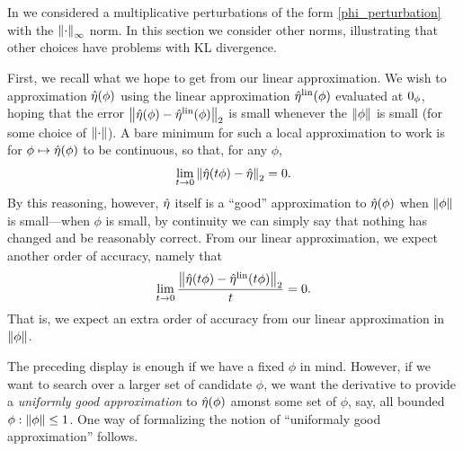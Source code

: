 In  we considered a multiplicative perturbations
of the form \eqref{phi_perturbation} with the $\left\Vert\cdot\right\Vert_{\infty}$ norm.  In
this section we consider other norms, illustrating that other choices
have problems with KL divergence.

First, we recall what we hope to get from our linear approximation.  We wish to
approximation $\hat\eta(\phi)$ using the linear approximation $\hat\eta^{\mathrm{lin}}(\phi)$
evaluated at $0_\phi$, hoping that the error $\left\Vert\hat\eta(\phi) -
\hat\eta^{\mathrm{lin}}(\phi)\right\Vert_2$ is small whenever the $\left\Vert\phi\right\Vert$ is small (for some choice
of $\left\Vert\cdot\right\Vert$).  A bare minimum for such a local approximation to work is
for $\phi \mapsto \hat\eta(\phi)$ to be continuous, so that, for any
$\phi$,
%
\begin{align*}
%
\lim_{t \rightarrow 0} \norm{\etaopt(t \phi) - \etaopt}_2 = 0.
%
\end{align*}
%
By this reasoning, however, $\hat\eta$ itself is a ``good'' approximation to
$\hat\eta(\phi)$ when $\left\Vert\phi\right\Vert$ is small---when $\phi$ is small, by
continuity we can simply say that nothing has changed and be reasonably correct.
From our linear approximation, we expect another order of accuracy, namely that
%
\begin{align*}
%
\lim_{t \rightarrow 0} \frac{\norm{\etaopt(t \phi) - \etalin(t\phi)}_2}{t} = 0.
%
\end{align*}
%
That is, we expect an extra order of accuracy from our linear approximation
in $\left\Vert\phi\right\Vert$.

The preceding display is enough if we have a fixed $\phi$ in mind.  However, if
we want to search over a larger set of candidate $\phi$, we want the derivative
to provide a {\em uniformly good approximation} to $\hat\eta(\phi)$ amonst some
set of $\phi$, say, all bounded $\phi: \left\Vert\phi\right\Vert \le 1$.  One way of
formalizing the notion of ``uniformaly good approximation'' follows.

